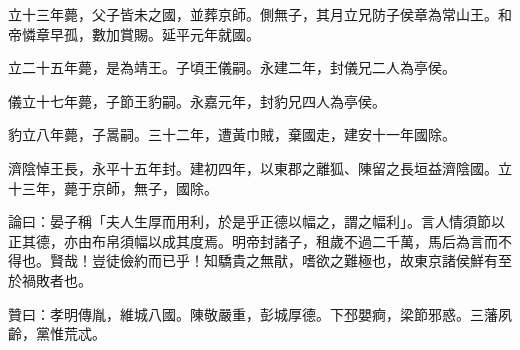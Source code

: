 \begin{pinyinscope}
立十三年薨，父子皆未之國，並葬京師。側無子，其月立兄防子侯章為常山王。和帝憐章早孤，數加賞賜。延平元年就國。

立二十五年薨，是為靖王。子頃王儀嗣。永建二年，封儀兄二人為亭侯。

儀立十七年薨，子節王豹嗣。永嘉元年，封豹兄四人為亭侯。

豹立八年薨，子暠嗣。三十二年，遭黃巾賊，棄國走，建安十一年國除。

濟陰悼王長，永平十五年封。建初四年，以東郡之離狐、陳留之長垣益濟陰國。立十三年，薨于京師，無子，國除。

論曰：晏子稱「夫人生厚而用利，於是乎正德以幅之，謂之幅利」。言人情須節以正其德，亦由布帛須幅以成其度焉。明帝封諸子，租歲不過二千萬，馬后為言而不得也。賢哉！豈徒儉約而已乎！知驕貴之無猒，嗜欲之難極也，故東京諸侯鮮有至於禍敗者也。

贊曰：孝明傳胤，維城八國。陳敬嚴重，彭城厚德。下邳嬰痾，梁節邪惑。三藩夙齡，黨惟荒忒。


\end{pinyinscope}